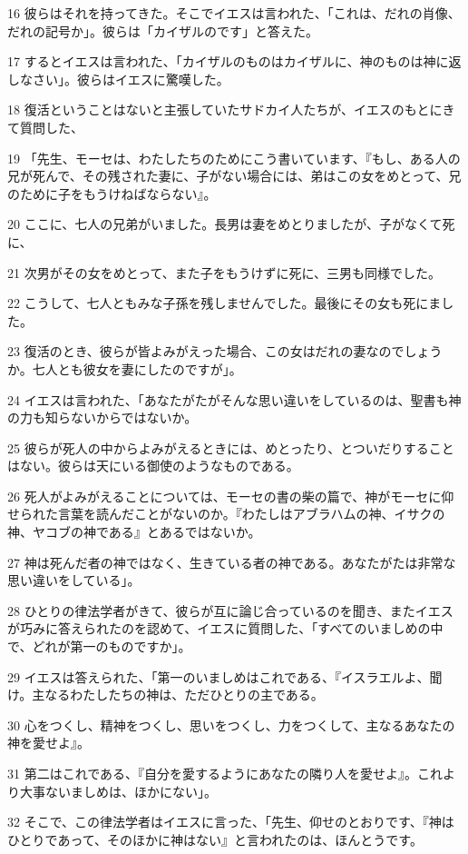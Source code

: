 \par 16 彼らはそれを持ってきた。そこでイエスは言われた、「これは、だれの肖像、だれの記号か」。彼らは「カイザルのです」と答えた。
\par 17 するとイエスは言われた、「カイザルのものはカイザルに、神のものは神に返しなさい」。彼らはイエスに驚嘆した。
\par 18 復活ということはないと主張していたサドカイ人たちが、イエスのもとにきて質問した、
\par 19 「先生、モーセは、わたしたちのためにこう書いています、『もし、ある人の兄が死んで、その残された妻に、子がない場合には、弟はこの女をめとって、兄のために子をもうけねばならない』。
\par 20 ここに、七人の兄弟がいました。長男は妻をめとりましたが、子がなくて死に、
\par 21 次男がその女をめとって、また子をもうけずに死に、三男も同様でした。
\par 22 こうして、七人ともみな子孫を残しませんでした。最後にその女も死にました。
\par 23 復活のとき、彼らが皆よみがえった場合、この女はだれの妻なのでしょうか。七人とも彼女を妻にしたのですが」。
\par 24 イエスは言われた、「あなたがたがそんな思い違いをしているのは、聖書も神の力も知らないからではないか。
\par 25 彼らが死人の中からよみがえるときには、めとったり、とついだりすることはない。彼らは天にいる御使のようなものである。
\par 26 死人がよみがえることについては、モーセの書の柴の篇で、神がモーセに仰せられた言葉を読んだことがないのか。『わたしはアブラハムの神、イサクの神、ヤコブの神である』とあるではないか。
\par 27 神は死んだ者の神ではなく、生きている者の神である。あなたがたは非常な思い違いをしている」。
\par 28 ひとりの律法学者がきて、彼らが互に論じ合っているのを聞き、またイエスが巧みに答えられたのを認めて、イエスに質問した、「すべてのいましめの中で、どれが第一のものですか」。
\par 29 イエスは答えられた、「第一のいましめはこれである、『イスラエルよ、聞け。主なるわたしたちの神は、ただひとりの主である。
\par 30 心をつくし、精神をつくし、思いをつくし、力をつくして、主なるあなたの神を愛せよ』。
\par 31 第二はこれである、『自分を愛するようにあなたの隣り人を愛せよ』。これより大事ないましめは、ほかにない」。
\par 32 そこで、この律法学者はイエスに言った、「先生、仰せのとおりです、『神はひとりであって、そのほかに神はない』と言われたのは、ほんとうです。
